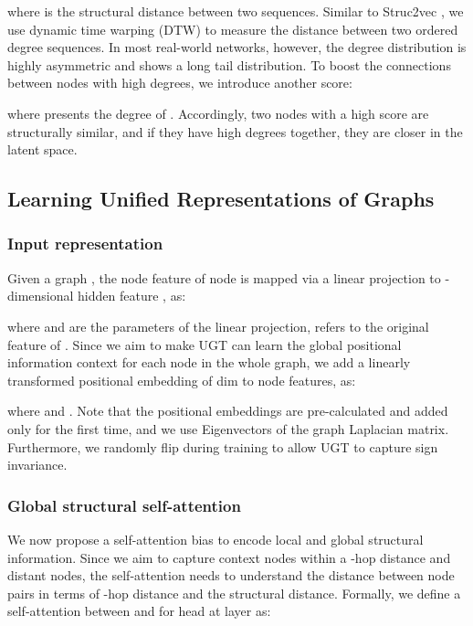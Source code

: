 \documentclass[oneside]{article}
\begin{document}
where  is the structural distance between two sequences.
Similar to Struc2vec \cite{ribeiro2017struc2vec}, we use dynamic time warping (DTW) to measure the distance between two ordered degree sequences.
In most real-world networks, however, the degree distribution is highly asymmetric and shows a long tail distribution.
To boost the connections between nodes with high degrees, we introduce another score:

where  presents the degree of .
Accordingly, two nodes with a high score are structurally similar, and if they have high degrees together, they are closer in the latent space.





\subsection{Learning Unified Representations of Graphs}





\subsubsection{Input representation}

Given a graph , the node feature  of node  is mapped via a linear projection to -dimensional hidden feature , as:

where  and  are the parameters of the linear projection,  refers to the original feature of .
Since we aim to make UGT can learn the global positional information context for each node in the whole graph, we add a linearly transformed positional embedding  of dim  to node features, as:

where  and .
Note that the positional embeddings are pre-calculated and added only for the first time, and we use Eigenvectors of the graph Laplacian matrix.
Furthermore, we randomly flip  during training to allow UGT to capture sign invariance.



\subsubsection{Global structural self-attention } 

We now propose a self-attention bias to encode local and global structural information. 
Since we aim to capture context nodes within a -hop distance and distant nodes, the self-attention needs to understand the distance between node pairs in terms of -hop distance and the structural distance.
Formally, we define a self-attention between  and  for head  at layer  as:
\end{document}
